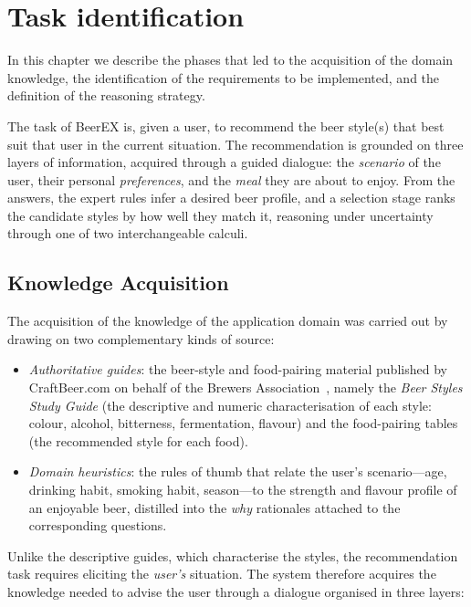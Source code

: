 \chapter{Task identification}

In this chapter we describe the phases that led to the acquisition of the domain
knowledge, the identification of the requirements to be implemented, and the
definition of the reasoning strategy.

The task of BeerEX is, given a user, to recommend the beer style(s) that best
suit that user in the current situation. The recommendation is grounded on three
layers of information, acquired through a guided dialogue: the \emph{scenario} of
the user, their personal \emph{preferences}, and the \emph{meal} they are about
to enjoy. From the answers, the expert rules infer a desired beer profile, and a
selection stage ranks the candidate styles by how well they match it, reasoning
under uncertainty through one of two interchangeable calculi.


\section{Knowledge Acquisition}

The acquisition of the knowledge of the application domain was carried out by
drawing on two complementary kinds of source:

\begin{itemize}
    \item \emph{Authoritative guides}: the beer-style and food-pairing material
    published by CraftBeer.com on behalf of the Brewers
    Association~\cite{craftbeer-styles,craftbeer-food}, namely the \emph{Beer Styles
    Study Guide} (the descriptive and numeric characterisation of each style:
    colour, alcohol, bitterness, fermentation, flavour) and the food-pairing
    tables (the recommended style for each food).

    \item \emph{Domain heuristics}: the rules of thumb that relate the user's
    scenario---age, drinking habit, smoking habit, season---to the strength
    and flavour profile of an enjoyable beer, distilled into the \emph{why}
    rationales attached to the corresponding questions.
\end{itemize}

Unlike the descriptive guides, which characterise the styles, the recommendation
task requires eliciting the \emph{user's} situation. The system therefore
acquires the knowledge needed to advise the user through a dialogue organised in
three layers:

